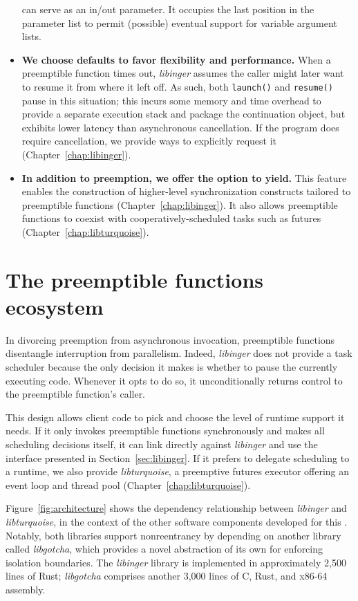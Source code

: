 \begin{itemize}
	can serve as an in/out parameter.  It occupies the last position in the
	parameter list to permit (possible) eventual support for variable argument
	lists.
\item \textbf{We choose defaults to favor flexibility and performance.}  When a
	preemptible function times out, \textit{libinger} assumes the caller might
	later want to resume it from where it left off.  As such, both
	\texttt{launch()} and \texttt{resume()} pause in this situation; this incurs
	some memory and time overhead to provide a separate execution stack and
	package the continuation object, but exhibits lower latency than
	asynchronous cancellation.  If the program does require cancellation, we
	provide ways to explicitly request it (Chapter~\ref{chap:libinger}).
\item \textbf{In addition to preemption, we offer the option to yield.} This feature
	enables the construction of higher-level synchronization constructs tailored
	to preemptible functions (Chapter~\ref{chap:libinger}).  It also allows
	preemptible functions to coexist with cooperatively-scheduled tasks
	such as futures (Chapter~\ref{chap:libturquoise}).
\end{itemize}


\section{The preemptible functions ecosystem}
\label{sec:libinger:concurrency}

In divorcing preemption from asynchronous invocation, preemptible functions
disentangle interruption from parallelism.  Indeed, \textit{libinger} does not
provide a task scheduler because the only decision it makes is whether to pause the
currently executing code.  Whenever it opts to do so, it unconditionally returns
control to the preemptible function's caller.

This design allows client code to pick and choose the level of runtime support it
needs.  If it only invokes preemptible functions synchronously and makes all
scheduling decisions itself, it can link directly against \textit{libinger} and use
the interface presented in Section~\ref{sec:libinger}.  If it prefers to delegate
scheduling to a runtime, we also provide \textit{libturquoise}, a preemptive futures
executor offering an event loop and thread pool
(Chapter~\ref{chap:libturquoise}).

Figure~\ref{fig:architecture} shows the dependency relationship between
\textit{libinger} and \textit{libturquoise}, in the context of the other software
components developed for this \thesis.  Notably, both libraries support nonreentrancy
by depending on another library called \textit{libgotcha}, which provides a novel
abstraction of its own for enforcing isolation boundaries.  The \textit{libinger}
library is implemented in approximately 2,500 lines of Rust; \textit{libgotcha}
comprises another 3,000 lines of C, Rust, and x86-64 assembly.

